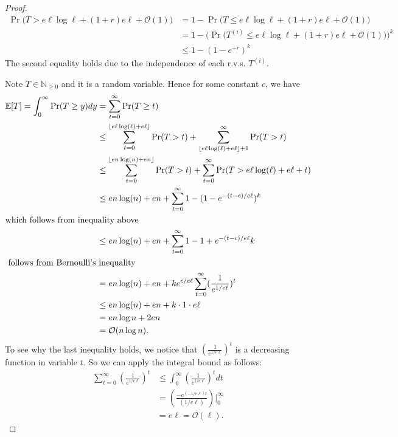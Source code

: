 \documentclass[a4paper,11pt]{report}
\DeclarePairedDelimiter\floor{\lfloor}{\rfloor}
\theoremstyle{plain} %
\theoremstyle{definition} %
\theoremstyle{remark} %
\begin{document}
\begin{proof}
\begin{align*}
    \Pr \big( T>  e\ell \log \ell +(1+r) e\ell +\mathcal{O}(1) \big) & = 1-\Pr \big( T \leq  e\ell \log \ell +(1+r) e\ell +\mathcal{O}(1) \big) \\
   & = 1-   \Big( \Pr \big(T^{(i)}\leq e\ell \log \ell +(1+r) e\ell +\mathcal{O}(1) \big) \Big)^k  \\
   & \leq 1 - (1-e^{-r})^k 
\end{align*}
The second equality holds due to the independence of each r.v.s. $T^{(i)}$. 
\par Note $T \in \mathbb{N}_{\geq 0}$ and it is a random variable. Hence for some constant $c$, we have
\begin{align*}
    \mathbb{E}[T] = \int_{0}^{\infty} \Pr (T\geq y) dy & = \sum_{t=0}^{\infty}\Pr (T\geq t)\\
                                                     & \leq \sum_{t=0}^{\floor{e\ell\log (\ell) +e\ell} } \Pr (T>t) + \sum_{\floor{e\ell\log (\ell) +e\ell}+1 }^{\infty} \Pr(T>t) \\
                                                     & \leq \sum_{t=0}^{\floor{en\log (n) +en} } \Pr(T>t) + \sum_{t=0}^{\infty} \Pr(T>e\ell \log (\ell) +e\ell + t)\\
                                                     &\leq en\log (n) +en + \sum_{t=0}^{\infty}1-(1-e^{-(t-c)/e\ell})^k \\ \intertext{which follows from inequality above}
                                                     &\leq en\log (n) +en + \sum_{t=0}^{\infty} 1 -1 + e^{-(t-c)/e\ell} k  \\ \intertext{  follows from Bernoulli's inequality}
                                                     &=en\log (n) +en + k e^{c/e\ell} \sum_{t=0}^{\infty} (\frac{1}{e^{1/e\ell}})^t \\                         & \leq en \log (n) + en + k\cdot 1\cdot e\ell\\
                                                     & = en\log n + 2 en \\
                            &=\mathcal{O}(n\log n).
\end{align*}
 To see why the last inequality holds, we notice that  $(\frac{1}{e^{1/e\ell}})^t$ is a decreasing function in variable $t$. So we can apply the integral bound as follows:
 \begin{align*}
     \sum_{t=0}^{\infty} (\frac{1}{e^{1/e\ell}})^t & \leq \int_{0}^{\infty} (\frac{1}{e^{1/e\ell}})^t dt \\
                                                & = (\frac{-e^{(-1/e\ell)t}}{(1/e\ell)} )|_{0}^{\infty} \\
                                                & = e\ell = \mathcal{O}(\ell).
 \end{align*}
\end{proof}
\end{document}
